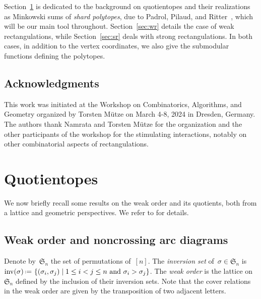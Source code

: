 \documentclass{amsart}
\theoremstyle{definition}
\newcommand{\f}[1]{\mathfrak{#1}} %
\newcommand{\set}[2]{\left\{ #1 \;\middle|\; #2 \right\}} %
\newcommand{\eqdef}{\mbox{\,\raisebox{0.2ex}{\scriptsize\ensuremath{\mathrm:}}\ensuremath{=}\,}} %
\DeclareMathOperator{\inv}{inv} %
\newcommand{\darkblue}{\color{darkblue}} %
\newcommand{\defn}[1]{\textsl{\darkblue #1}} %
\begin{document}
Section~\ref{sec:quotientopes} is dedicated to the background on quotientopes and their realizations as Minkowski sums of \defn{shard polytopes}, due to Padrol, Pilaud, and Ritter~\cite{MR4584712}, which will be our main tool throughout. Section~\ref{sec:wr} details the case of weak rectangulations, while Section~\ref{sec:sr} deals with strong rectangulations. In both cases, in addition to the vertex coordinates, we also give the submodular functions defining the polytopes.

\subsection*{Acknowledgments}

This work was initiated at the Workshop on Combinatorics, Algorithms, and Geometry organized by Torsten M\"utze on March 4-8, 2024 in Dresden, Germany.
The authors thank Namrata and Torsten M\"utze for the organization and the other participants of the workshop for the stimulating interactions, notably on other combinatorial aspects of rectangulations.


\section{Quotientopes}
\label{sec:quotientopes}

We now briefly recall some results on the weak order and its quotients, both from a lattice and geometric perspectives.
We refer to \cite{Reading-arcDiagrams, Reading-Chapters, PadrolPilaudRitter} for details.

\subsection{Weak order and noncrossing arc diagrams}

Denote by~$\f{S}_n$ the set of permutations of~$[n]$.
The \defn{inversion set} of~$\sigma \in \f{S}_n$ is~$\inv(\sigma) \eqdef \set{(\sigma_i, \sigma_j)}{1 \le i < j \le n \text{ and } \sigma_i > \sigma_j}$.
The \defn{weak order} is the lattice on~$\f{S}_n$ defined by the inclusion of their inversion sets.
Note that the cover relations in the weak order are given by the transposition of two adjacent letters.
\end{document}
